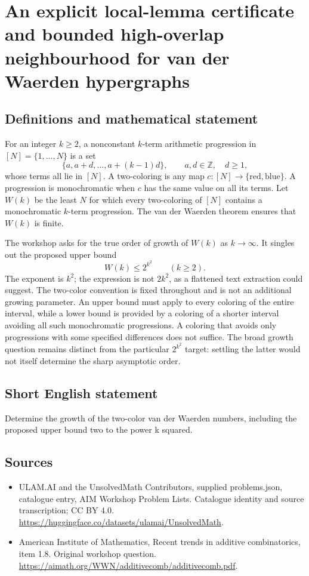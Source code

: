 \documentclass[11pt,a4paper]{article}
\begin{document}
\section*{An explicit local-lemma certificate and bounded high-overlap neighbourhood for van der Waerden hypergraphs}\label{statement}

\subsection{Definitions and mathematical statement}
For an integer $k\ge2$, a nonconstant $k$-term arithmetic progression
in $[N]=\{1,\ldots,N\}$ is a set
\[
                   \{a,a+d,\ldots,a+(k-1)d\},
                 \qquad a,d\in\mathbb Z,\quad d\ge1,
\]
whose terms all lie in $[N]$. A two-coloring is any map
$c:[N]\to\{\mathrm{red},\mathrm{blue}\}$. A progression is
monochromatic when $c$ has the same value on all its terms.
Let $W(k)$ be the least $N$ for which every two-coloring of $[N]$
contains a monochromatic $k$-term progression. The van der Waerden
theorem ensures that $W(k)$ is finite.

The workshop asks for the true order of growth of $W(k)$ as
$k\to\infty$. It singles out the proposed upper bound
\[
                              W(k)\le2^{k^2}
                                      \qquad(k\ge2).
\]
The exponent is $k^2$; the expression is not $2k^2$, as a flattened
text extraction could suggest. The two-color convention is fixed
throughout and is not an additional growing parameter.
An upper bound must apply to every coloring of the entire interval,
while a lower bound is provided by a coloring of a shorter interval
avoiding all such monochromatic progressions. A coloring that avoids
only progressions with some specified differences does not suffice.
The broad growth question remains distinct from the particular
$2^{k^2}$ target: settling the latter would not itself determine
the sharp asymptotic order.
\subsection{Short English statement}
Determine the growth of the two-color van der Waerden numbers, including the proposed upper bound two to the power k squared.
\subsection{Sources}
\begin{itemize}
\item[S1] ULAM.AI and the UnsolvedMath Contributors, supplied problems.json, catalogue entry, AIM Workshop Problem Lists. Catalogue identity and source transcription; CC BY 4.0.
\url{https://huggingface.co/datasets/ulamai/UnsolvedMath}.
\item[S2] American Institute of Mathematics, Recent trends in additive combinatorics, item 1.8. Original workshop question.
\url{https://aimath.org/WWN/additivecomb/additivecomb.pdf}.
\end{itemize}
\end{document}
